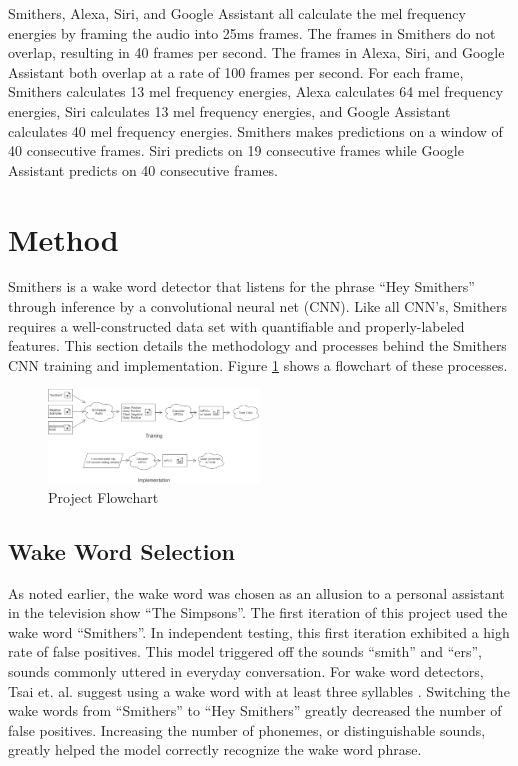 \documentclass[conference]{IEEEtran}
\begin{document}
Smithers, Alexa, Siri, and Google Assistant all calculate the mel frequency energies
by framing the audio into 25ms frames.
The frames in Smithers do not overlap, resulting in 40 frames per second.
The frames in Alexa, Siri, and Google Assistant both overlap at a rate of 100 frames per second.
For each frame, Smithers calculates 13 mel frequency energies, Alexa calculates 64 mel frequency energies, 
Siri calculates 13 mel frequency energies, and Google Assistant calculates 40 mel frequency energies.
Smithers makes predictions on a window of 40 consecutive frames. 
Siri predicts on 19 consecutive frames while Google Assistant predicts on 40 consecutive frames.

\section{Method} \label{sec:method}

Smithers is a wake word detector that listens for the phrase ``Hey Smithers''
through inference by a convolutional neural net (CNN).
Like all CNN's, Smithers requires a well-constructed data set
with quantifiable and properly-labeled features.
This section details the methodology and processes
behind the Smithers CNN training and implementation.
Figure \ref{fig:flow} shows a flowchart of these processes.

\begin{figure}[htbp]
    \centerline{\includegraphics[width=0.5\textwidth]{figs/flow.png}}
    \caption{Project Flowchart}
    \label{fig:flow}
\end{figure}

\subsection{Wake Word Selection}
As noted earlier, the wake word was chosen
as an allusion to a personal assistant in the television show ``The Simpsons''.
The first iteration of this project used the wake word ``Smithers''.
In independent testing, this first iteration exhibited a high rate of false positives. 
This model triggered off the sounds ``smith'' and ``ers'',
sounds commonly uttered in everyday conversation.
For wake word detectors, Tsai et. al. suggest using a wake word
with at least three syllables \cite{syllables}. 
Switching the wake words from ``Smithers'' to ``Hey Smithers''
greatly decreased the number of false positives.
Increasing the number of phonemes, or distinguishable sounds, greatly helped the model 
correctly recognize the wake word phrase.
\end{document}
